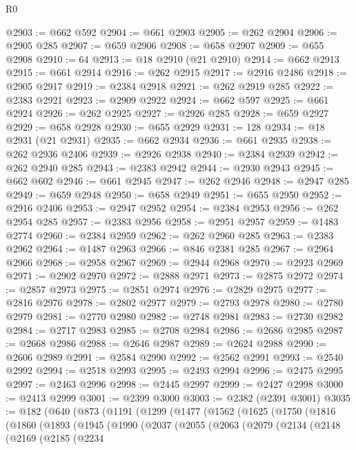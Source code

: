 \begin{lexlean}{R0}
\begin{coremodule}
@2903 := @662 @592
@2904 := @661 @2903
@2905 := @262 @2904
@2906 := @2905 @285
@2907 := @659 @2906
@2908 := @658 @2907
@2909 := @655 @2908
@2910 := 64
@2913 := @18 @2910 (@21 @2910)
@2914 := @662 @2913
@2915 := @661 @2914
@2916 := @262 @2915
@2917 := @2916 @2486
@2918 := @2905 @2917
@2919 := @2384 @2918
@2921 := @262 @2919 @285
@2922 := @2383 @2921
@2923 := @2909 @2922
@2924 := @662 @597
@2925 := @661 @2924
@2926 := @262 @2925
@2927 := @2926 @285
@2928 := @659 @2927
@2929 := @658 @2928
@2930 := @655 @2929
@2931 := 128
@2934 := @18 @2931 (@21 @2931)
@2935 := @662 @2934
@2936 := @661 @2935
@2938 := @262 @2936 @2406
@2939 := @2926 @2938
@2940 := @2384 @2939
@2942 := @262 @2940 @285
@2943 := @2383 @2942
@2944 := @2930 @2943
@2945 := @662 @602
@2946 := @661 @2945
@2947 := @262 @2946
@2948 := @2947 @285
@2949 := @659 @2948
@2950 := @658 @2949
@2951 := @655 @2950
@2952 := @2916 @2406
@2953 := @2947 @2952
@2954 := @2384 @2953
@2956 := @262 @2954 @285
@2957 := @2383 @2956
@2958 := @2951 @2957
@2959 := @1483 @2774
@2960 := @2384 @2959
@2962 := @262 @2960 @285
@2963 := @2383 @2962
@2964 := @1487 @2963
@2966 := @846 @2381 @285
@2967 := @2964 @2966
@2968 := @2958 @2967
@2969 := @2944 @2968
@2970 := @2923 @2969
@2971 := @2902 @2970
@2972 := @2888 @2971
@2973 := @2875 @2972
@2974 := @2857 @2973
@2975 := @2851 @2974
@2976 := @2829 @2975
@2977 := @2816 @2976
@2978 := @2802 @2977
@2979 := @2793 @2978
@2980 := @2780 @2979
@2981 := @2770 @2980
@2982 := @2748 @2981
@2983 := @2730 @2982
@2984 := @2717 @2983
@2985 := @2708 @2984
@2986 := @2686 @2985
@2987 := @2668 @2986
@2988 := @2646 @2987
@2989 := @2624 @2988
@2990 := @2606 @2989
@2991 := @2584 @2990
@2992 := @2562 @2991
@2993 := @2540 @2992
@2994 := @2518 @2993
@2995 := @2493 @2994
@2996 := @2475 @2995
@2997 := @2463 @2996
@2998 := @2445 @2997
@2999 := @2427 @2998
@3000 := @2413 @2999
@3001 := @2399 @3000
@3003 := @2382 (@2391 @3001)
@3035 := @182
    (@640
      (@873
        (@1191
          (@1299
            (@1477
              (@1562
                (@1625
                  (@1750
                    (@1816
                      (@1860
                        (@1893
                          (@1945
                            (@1990
                              (@2037
                                (@2055
                                  (@2063
                                    (@2079
                                      (@2134
                                        (@2148
                                          (@2169
                                            (@2185
                                              (@2234

\end{coremodule}
\end{lexlean}
